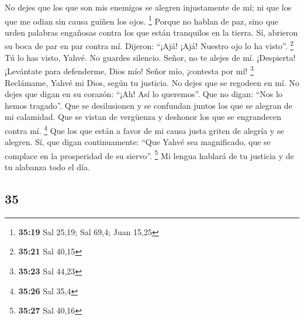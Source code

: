 \begin{paracol}{2}
 No dejes que los que son mis enemigos se alegren
injustamente de mí; ni que los que me odian sin causa guiñen los ojos.
\footnote{\textbf{35:19} Sal 25,19; Sal 69,4; Juan 15,25}
 Porque no hablan de paz, sino que urden palabras
engañosas contra los que están tranquilos en la tierra. 
Sí, abrieron su boca de par en par contra mí. Dijeron: ``¡Ajá! ¡Ajá!
Nuestro ojo lo ha visto''. \footnote{\textbf{35:21} Sal 40,15}
 Tú lo has visto, Yahvé. No guardes silencio. Señor, no
te alejes de mí.  ¡Despierta! ¡Levántate para defenderme,
Dios mío! Señor mío, ¡contesta por mí! \footnote{\textbf{35:23} Sal
  44,23}  Reclámame, Yahvé mi Dios, según tu justicia. No
dejes que se regodeen en mí.  No dejes que digan en su
corazón: ``¡Ah! Así lo queremos''. Que no digan: ``Nos lo hemos
tragado''.  Que se desilusionen y se confundan juntos los
que se alegran de mi calamidad. Que se vistan de vergüenza y deshonor
los que se engrandecen contra mí. \footnote{\textbf{35:26} Sal 35,4}
 Que los que están a favor de mi causa justa griten de
alegría y se alegren. Sí, que digan continuamente: ``Que Yahvé sea
magnificado, que se complace en la prosperidad de su siervo''.
\footnote{\textbf{35:27} Sal 40,16}  Mi lengua hablará de
tu justicia y de tu alabanza todo el día.

\switchcolumn
\begin{otherlanguage}{english}

\hypertarget{section-69}{%
\section{35}\label{section-69}}


\end{otherlanguage}
\end{paracol}
